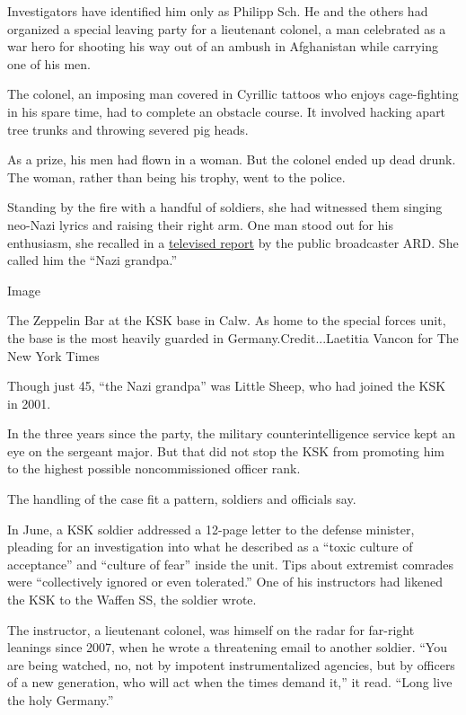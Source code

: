 Investigators have identified him only as Philipp Sch. He and the others
had organized a special leaving party for a lieutenant colonel, a man
celebrated as a war hero for shooting his way out of an ambush in
Afghanistan while carrying one of his men.

The colonel, an imposing man covered in Cyrillic tattoos who enjoys
cage-fighting in his spare time, had to complete an obstacle course. It
involved hacking apart tree trunks and throwing severed pig heads.

As a prize, his men had flown in a woman. But the colonel ended up dead
drunk. The woman, rather than being his trophy, went to the police.

Standing by the fire with a handful of soldiers, she had witnessed them
singing neo-Nazi lyrics and raising their right arm. One man stood out
for his enthusiasm, she recalled in a
\href{https://daserste.ndr.de/panorama/archiv/2017/Hitlergruss-Ermittlungen-gegen-Kompaniechef,bundeswehr1738.html}{televised
report} by the public broadcaster ARD. She called him the ``Nazi
grandpa.''

Image

The Zeppelin Bar at the KSK base in Calw. As home to the special forces
unit, the base is the most heavily guarded in Germany.Credit...Laetitia
Vancon for The New York Times

Though just 45, ``the Nazi grandpa'' was Little Sheep, who had joined
the KSK in 2001.

In the three years since the party, the military counterintelligence
service kept an eye on the sergeant major. But that did not stop the KSK
from promoting him to the highest possible noncommissioned officer rank.

The handling of the case fit a pattern, soldiers and officials say.

In June, a KSK soldier addressed a 12-page letter to the defense
minister, pleading for an investigation into what he described as a
``toxic culture of acceptance'' and ``culture of fear'' inside the unit.
Tips about extremist comrades were ``collectively ignored or even
tolerated.'' One of his instructors had likened the KSK to the Waffen
SS, the soldier wrote.

The instructor, a lieutenant colonel, was himself on the radar for
far-right leanings since 2007, when he wrote a threatening email to
another soldier. ``You are being watched, no, not by impotent
instrumentalized agencies, but by officers of a new generation, who will
act when the times demand it,'' it read. ``Long live the holy Germany.''

